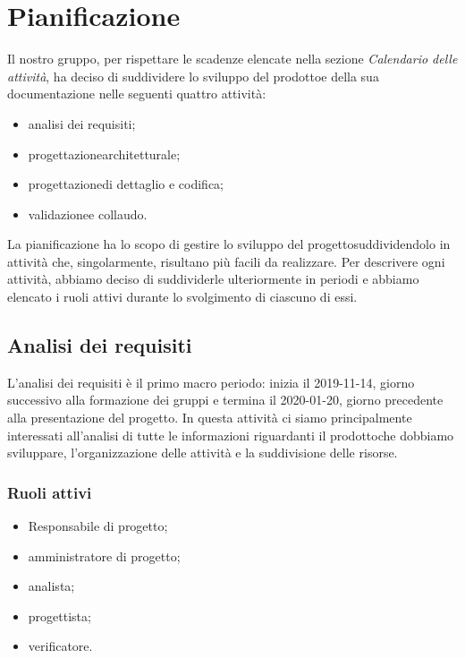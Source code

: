 \section{Pianificazione} 
Il nostro gruppo, per rispettare le scadenze elencate nella sezione \textit{Calendario delle attività}, ha deciso di suddividere lo sviluppo del prodotto\glosp e della sua documentazione nelle seguenti quattro attività:
\begin{itemize}
	\item analisi dei requisiti;
	\item progettazione\glosp architetturale;
	\item progettazione\glosp di dettaglio e codifica;
	\item validazione\glosp e collaudo.
\end{itemize}
La pianificazione ha lo scopo di gestire lo sviluppo del progetto\glosp suddividendolo in attività che, singolarmente, risultano più facili da realizzare. Per descrivere ogni attività, abbiamo deciso di suddividerle ulteriormente in periodi e abbiamo elencato i ruoli attivi durante lo svolgimento di ciascuno di essi.

\subsection{Analisi dei requisiti}
L'analisi dei requisiti è il primo macro periodo: inizia il 2019-11-14, giorno successivo alla formazione dei gruppi e termina il 2020-01-20, giorno precedente alla presentazione del progetto\glo. In questa attività ci siamo principalmente interessati all'analisi di tutte le informazioni riguardanti il prodotto\glosp che dobbiamo sviluppare, l'organizzazione delle attività e la suddivisione delle risorse.

\subsubsection{Ruoli attivi}
\begin{itemize}
	\item Responsabile di progetto\glo;
	\item amministratore di progetto\glo;
	\item analista;
	\item progettista;
	\item verificatore.
\end{itemize}

